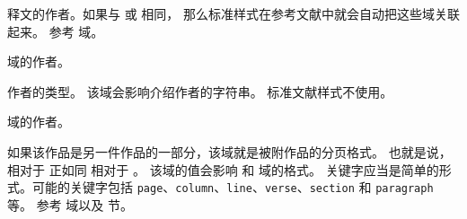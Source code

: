 \begin{fieldlist}

释文的作者。如果与  或  相同，
那么标准样式在参考文献中就会自动把这些域关联起来。
参考  域。




 域的作者。




作者的类型。
该域会影响介绍作者的字符串。
标准文献样式不使用。




 域的作者。




如果该作品是另一件作品的一部分，该域就是被附作品的分页格式。
也就是说， 相对于  正如同  相对于 。
该域的值会影响  和  域的格式。
关键字应当是简单的形式。可能的关键字包括 \texttt{page}、\texttt{column}、\texttt{line}、\texttt{verse}、\texttt{section} 和 \texttt{paragraph} 等。
参考  域以及  节。




\end{fieldlist}
